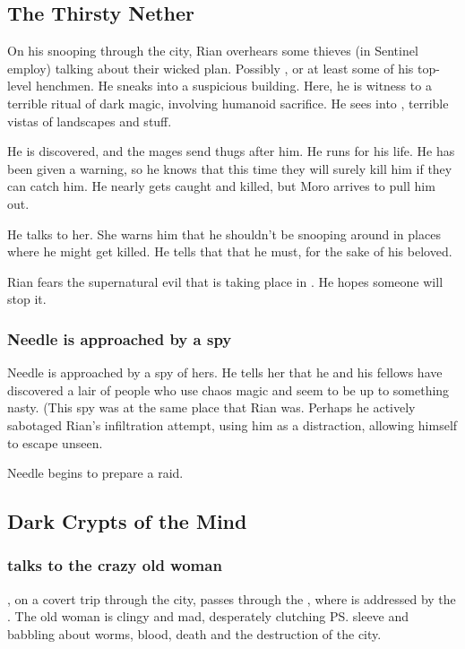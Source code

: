 \subsection{The Thirsty Nether}
On his snooping through the city, Rian overhears some thieves (in Sentinel employ) talking about their wicked plan. 
Possibly \Psyrex{}, or at least some of his top-level henchmen. 
He sneaks into a suspicious building. 
Here, he is witness to a terrible ritual of dark magic, involving humanoid sacrifice. 
He sees into \Machai, terrible vistas of \daemonic{} landscapes and stuff. 

He is discovered, and the mages send thugs after him. 
He runs for his life. 
He has been given a warning, so he knows that this time they will surely kill him if they can catch him. 
He nearly gets caught and killed, but Moro \Cobrel{} arrives to pull him out. 

He talks to her. She warns him that he shouldn't be snooping around in places where he might get killed. He tells that that he must, for the sake of his beloved. 

Rian fears the supernatural evil that is taking place in \Malcur. 
He hopes someone will stop it. 





\subsubsection{Needle is approached by a spy}
Needle is approached by a spy of hers. He tells her that he and his fellows have discovered a lair of people who use chaos magic and seem to be up to something nasty. (This spy was at the same place that Rian was. Perhaps he actively sabotaged Rian's infiltration attempt, using him as a distraction, allowing himself to escape unseen. 

Needle begins to prepare a raid. 









\subsection{Dark Crypts of the Mind}





\subsubsection{\Tiroco{} talks to the crazy old woman}
\Tiroco, on a covert trip through the city, passes through the , where is addressed by the . The old woman is clingy and mad, desperately clutching \ps{\Tiroco} sleeve and babbling about worms, blood, death and the destruction of the city. 

